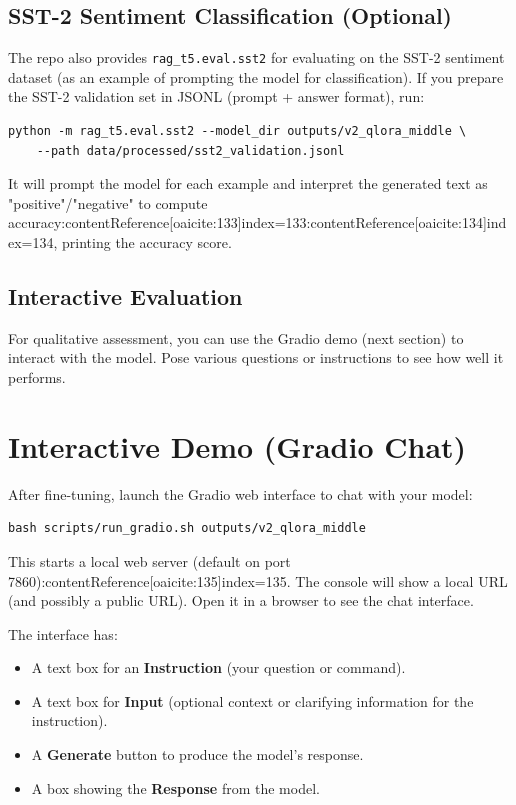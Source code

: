 \documentclass{article}
\begin{document}
\subsection*{SST-2 Sentiment Classification (Optional)}
The repo also provides \texttt{rag\_t5.eval.sst2} for evaluating on the SST-2 sentiment dataset (as an example of prompting the model for classification). If you prepare the SST-2 validation set in JSONL (prompt + answer format), run:
\begin{verbatim}
python -m rag_t5.eval.sst2 --model_dir outputs/v2_qlora_middle \
    --path data/processed/sst2_validation.jsonl
\end{verbatim}
It will prompt the model for each example and interpret the generated text as "positive"/"negative" to compute accuracy:contentReference[oaicite:133]{index=133}:contentReference[oaicite:134]{index=134}, printing the accuracy score.

\subsection*{Interactive Evaluation}
For qualitative assessment, you can use the Gradio demo (next section) to interact with the model. Pose various questions or instructions to see how well it performs.

\section{Interactive Demo (Gradio Chat)}
After fine-tuning, launch the Gradio web interface to chat with your model:
\begin{verbatim}
bash scripts/run_gradio.sh outputs/v2_qlora_middle
\end{verbatim}
This starts a local web server (default on port 7860):contentReference[oaicite:135]{index=135}. The console will show a local URL (and possibly a public URL). Open it in a browser to see the chat interface.

The interface has:
\begin{itemize}
    \item A text box for an \textbf{Instruction} (your question or command).
    \item A text box for \textbf{Input} (optional context or clarifying information for the instruction).
    \item A \textbf{Generate} button to produce the model’s response.
    \item A box showing the \textbf{Response} from the model.
\end{itemize}
\end{document}
